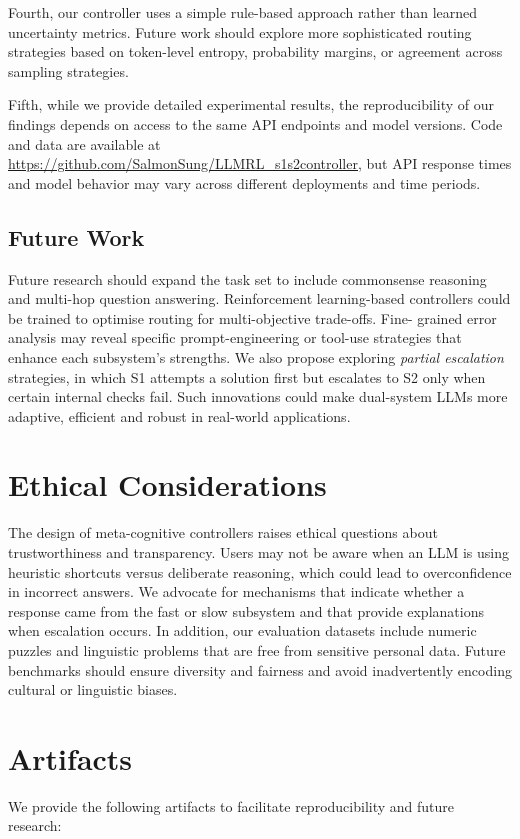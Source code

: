 \documentclass[11pt]{article}
\begin{document}
Fourth, our controller uses a simple rule-based approach rather than learned uncertainty metrics. Future work should explore more sophisticated routing strategies based on token-level entropy, probability margins, or agreement across sampling strategies.

Fifth, while we provide detailed experimental results, the reproducibility of our findings depends on access to the same API endpoints and model versions. Code and data are available at \url{https://github.com/SalmonSung/LLMRL_s1s2controller}, but API response times and model behavior may vary across different deployments and time periods.

\subsection{Future Work}
Future research should expand the task set to include commonsense reasoning
and multi-hop question answering.  Reinforcement learning-based controllers
could be trained to optimise routing for multi-objective trade-offs.  Fine-
grained error analysis may reveal specific prompt-engineering or tool-use
strategies that enhance each subsystem's strengths.  We also propose
exploring \emph{partial escalation} strategies, in which S1 attempts a
solution first but escalates to S2 only when certain internal checks fail.
Such innovations could make dual-system LLMs more adaptive, efficient and
robust in real-world applications.

\section{Ethical Considerations}
The design of meta-cognitive controllers raises ethical questions about
trustworthiness and transparency.  Users may not be aware when an LLM is
using heuristic shortcuts versus deliberate reasoning, which could lead to
overconfidence in incorrect answers.  We advocate for mechanisms that
indicate whether a response came from the fast or slow subsystem and that
provide explanations when escalation occurs.  In addition, our evaluation
datasets include numeric puzzles and linguistic problems that are free from
sensitive personal data.  Future benchmarks should ensure diversity and
fairness and avoid inadvertently encoding cultural or linguistic biases.

\section{Artifacts}
\label{sec:artifacts}
We provide the following artifacts to facilitate reproducibility and future research:
\end{document}
